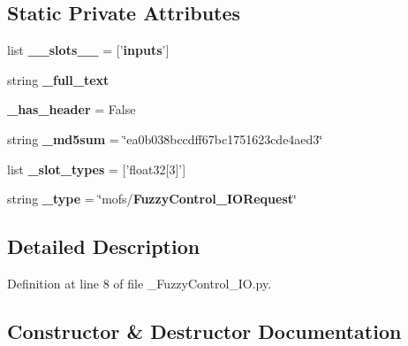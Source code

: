 \subsection*{Static Private Attributes}
\begin{DoxyCompactItemize}
\item 
list {\bf \-\_\-\-\_\-slots\-\_\-\-\_\-} = ['{\bf inputs}']
\item 
string {\bf \-\_\-full\-\_\-text}
\item 
{\bf \-\_\-has\-\_\-header} = False
\item 
string {\bf \-\_\-md5sum} = \char`\"{}ea0b038bccdff67bc1751623cde4aed3\char`\"{}
\item 
list {\bf \-\_\-slot\-\_\-types} = ['float32[3]']
\item 
string {\bf \-\_\-type} = \char`\"{}mofs/{\bf Fuzzy\-Control\-\_\-\-I\-O\-Request}\char`\"{}
\end{DoxyCompactItemize}


\subsection{Detailed Description}


Definition at line 8 of file \-\_\-\-Fuzzy\-Control\-\_\-\-I\-O.\-py.



\subsection{Constructor \& Destructor Documentation}
